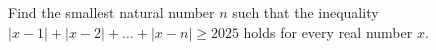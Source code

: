 Find the smallest natural number $n$ such that the inequality $|x-1|+|x-2|+\ldots+|x-n|\geqslant2025$ holds for every real number $x$.
